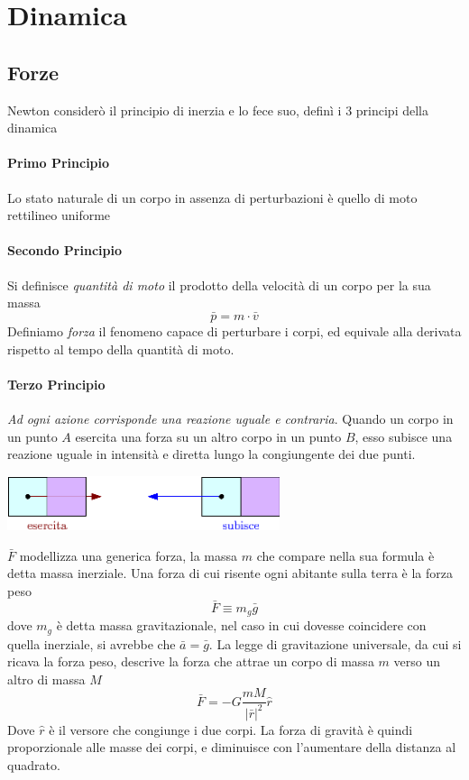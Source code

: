 \documentclass[10pt, letterpaper]{report}
\begin{document}
\chapter{Dinamica}
\section{Forze}
Newton considerò il principio di inerzia e lo fece suo, definì i 3 principi della dinamica
\subsubsection{Primo Principio}
Lo stato naturale di un corpo in assenza di perturbazioni è quello di moto rettilineo uniforme 
\subsubsection{Secondo Principio}
 Si definisce \textit{quantità di moto} il prodotto della velocità di un corpo per la sua massa 
$$ \bar p = m\cdot \bar v$$ 
Definiamo \textit{forza} il fenomeno capace di perturbare i corpi, ed equivale alla derivata rispetto al tempo 
della quantità di moto. 
\subsubsection{Terzo Principio}
\textit{Ad ogni azione corrisponde una reazione uguale e contraria}. Quando un corpo in un punto $A$ esercita una forza 
su un altro corpo in un punto $B$, esso subisce una reazione uguale in intensità e diretta lungo la 
congiungente dei due punti.\begin{center}
    \includegraphics[width=0.6\textwidth]{images/terzoPrincipio.eps}
\end{center}
$\bar F$ modellizza una generica forza, la massa $m$ che compare nella sua formula è detta 
massa inerziale. Una forza di cui risente ogni abitante sulla terra è la forza peso 
$$ \bar F \equiv m_g\bar g$$
dove $m_g$ è detta massa gravitazionale, nel caso in cui dovesse coincidere con quella 
inerziale, si avrebbe che $\bar a = \bar g$. La legge di gravitazione universale, da cui si ricava la 
forza peso, descrive la forza che attrae un corpo di massa $m$ verso un altro di massa $M$
$$ \bar F = -G\frac{mM}{|\bar r|^2}\hat r $$
Dove $\hat r$ è il versore che congiunge i due corpi. La forza di gravità è quindi proporzionale alle masse dei 
corpi, e diminuisce con l'aumentare della distanza al quadrato.
\end{document}
